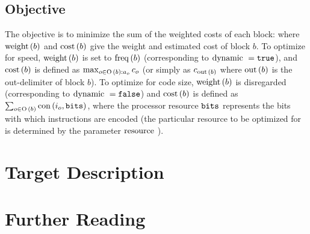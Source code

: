 \documentclass[11pt]{report}
\begin{document}
\section{Objective}

The objective is to minimize the sum of the weighted costs of each block:
%
\genericObjectiveEquation
%
where $\operatorname{weight}\,(b)$ and $\operatorname{cost}\,(b)$ give the weight and estimated cost
of block $b$.
%
To optimize for speed, $\operatorname{weight}\,(b)$ is set to $\operatorname{freq}\,(b)$
(corresponding to $\operatorname{dynamic}\,{}{} = \texttt{true}$), and $\operatorname{cost}\,(b)$ is
defined as $\max_{o \in \operatorname{O}\,(b) :
  a_{o}}{c_{o}}$ (or simply as
$c_{\operatorname{out}\,(b)}$ where $\operatorname{out}\,(b)$ is the
out-delimiter of block $b$).
%
To optimize for code size, $\operatorname{weight}\,(b)$ is disregarded (corresponding to
$\operatorname{dynamic}\,{}{} = \texttt{false}$) and $\operatorname{cost}\,(b)$ is defined as $\sum_{o
  \in \operatorname{O}\,(b)}{\operatorname{con}\,(i_{o}, \mathtt{bits}{})}$, where the
processor resource $\mathtt{bits}{}$ represents the bits with which instructions are
encoded (the particular resource to be optimized for is determined by the
parameter $\operatorname{resource}\,{}{}$).

\chapter{Target Description}
\label{sec:target-description}

\appendix

\chapter{Further Reading}
\label{sec:further-reading}
\end{document}
